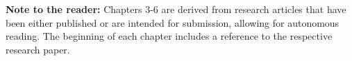 \textbf{Note to the reader:} Chapters 3-6 are derived from research articles that have been either published or are intended for submission, allowing for autonomous reading. The beginning of each chapter includes a reference to the respective research paper.

\vfill

